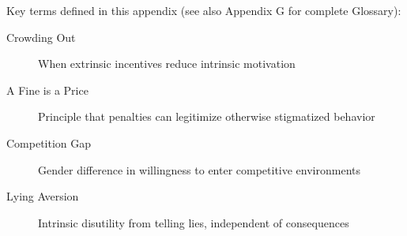 \begin{abstract}
This appendix integrates Uri Gneezy's influential research on incentives, gender differences in competition, and deception into the Evidence-Based Framework. Gneezy's work fundamentally changed how economists understand the relationship between extrinsic incentives and intrinsic motivation, demonstrating that monetary incentives can backfire by ``crowding out'' prosocial behavior. His cross-cultural studies on gender and competition revealed that competitive behavior is substantially shaped by culture, not just biology. This appendix provides critical parameters for CORE-HOW (incentive complementarities) and establishes boundary conditions for when incentives help versus harm.
\end{abstract}

\begin{tcolorbox}[colback=gray!10!white,colframe=gray!50!black,title=Quick Reference]
Key terms defined in this appendix (see also Appendix G for complete Glossary):
\begin{description}
    \item[Crowding Out] When extrinsic incentives reduce intrinsic motivation
    \item[A Fine is a Price] Principle that penalties can legitimize otherwise stigmatized behavior
    \item[Competition Gap] Gender difference in willingness to enter competitive environments
    \item[Lying Aversion] Intrinsic disutility from telling lies, independent of consequences
\end{description}
\end{tcolorbox}


